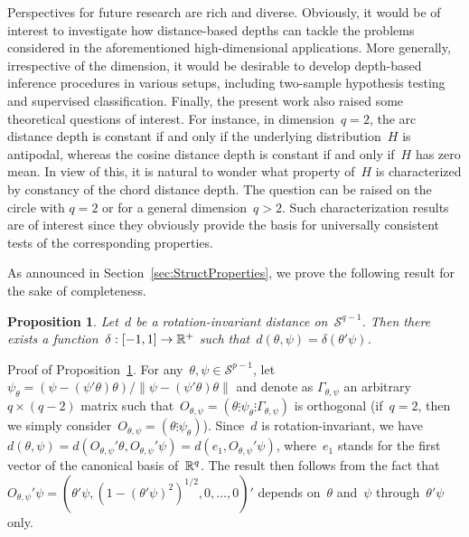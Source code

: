 \documentclass[usenames,dvipsnames]{article}
\newtheorem{prop}{Proposition}
\begin{document}
Perspectives for future research are rich and diverse. Obviously, it would be of interest to investigate how distance-based depths can tackle the problems considered in the aforementioned high-dimensional applications. More generally, irrespective of the dimension, it would be desirable to develop depth-based inference procedures in various setups, including two-sample hypothesis testing and supervised classification. Finally, the present work also raised some theoretical questions of interest. For instance, in dimension~$q=2$, the arc distance depth is constant if and only if the underlying distribution~$H$ is antipodal, whereas the cosine distance depth is constant if and only if~$H$ has zero mean. In view of this, it is natural to wonder what property of~$H$ is characterized by constancy of the chord distance depth. The question can be raised on the circle with $q=2$ or for a general dimension~$q>2$. Such characterization results are of interest since they obviously provide the basis for universally consistent tests of the corresponding properties. 






\appendix




As announced in Section~\ref{sec:StructProperties}, we prove the following result for the sake of completeness.

\begin{prop}
\label{prodistinv}
	Let~$d$ be a rotation-invariant distance on~$\mathcal{S}^{q-1}$. Then there exists a function~$\delta:[-1,1]\to\mathbb{R}^+$ such that~$d(\theta,\psi)=\delta(\theta'\psi)$.
\end{prop}

Proof of Proposition~\ref{prodistinv}.
For any~$\theta,\psi\in\mathcal{S}^{p-1}$, let~$\psi_\theta=(\psi-(\psi'\theta)\theta)/\|\psi-(\psi'\theta)\theta\|$ and denote as $\Gamma_{\theta,\psi}$ an arbitrary $q\times (q-2)$ matrix such that~$O_{\theta,\psi}=(\theta \vdots \psi_\theta \vdots \Gamma_{\theta,\psi})$ is orthogonal (if~$q=2$, then we simply consider~$O_{\theta,\psi}=(\theta \vdots \psi_\theta)$). Since~$d$ is rotation-invariant, we have~$d(\theta,\psi)=d(O_{\theta,\psi}'\theta,O_{\theta,\psi}'\psi)=d(e_1,O_{\theta,\psi}'\psi)$, where~$e_1$ stands for the first vector of the canonical basis of~$\mathbb{R}^q$. The result then follows from the fact that 
$
O_{\theta,\psi}'\psi
=
(
\theta'\psi , (1-(\theta'\psi)^2)^{1/2},0,\ldots,0
)'
$
depends on~$\theta$ and~$\psi$ through~$\theta'\psi$ only.
\cqfd
\vspace{3mm}
\end{document}
